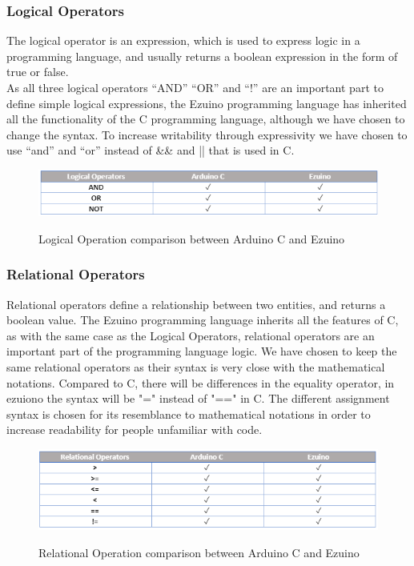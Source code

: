 \subsubsection*{Logical Operators}
The logical operator is an expression, which is used to express logic in a programming language, and usually returns a boolean expression in the form of true or false. \\
As all three logical operators “AND” “OR” and “!” are an important part to define simple logical expressions, the Ezuino programming language has inherited all the functionality of the C programming language, although we have chosen to change the syntax. To increase writability through expressivity we have chosen to use “and” and “or” instead of \&\& and || that is used in C.\\
\begin{figure}[H]
\centering
\caption{Logical Operation comparison between Arduino C and Ezuino}
\includegraphics[scale=0.80]{figures/language_features/langf03.png}
\label{lf03}
\end{figure}
\subsubsection*{Relational Operators}
Relational operators define a relationship between two entities, and returns a boolean value.
The Ezuino programming language inherits all the features of C, as with the same case as the Logical Operators, relational operators are an important part of the programming language logic. We have chosen to keep the same relational operators as their syntax is very close with the mathematical notations. Compared to C, there will be differences in the equality operator, in ezuiono the syntax will be "=" instead of "==" in C. The different assignment syntax is chosen for its resemblance to mathematical notations in order to increase readability for people unfamiliar with code.
\begin{figure}[H]
\centering
\caption{Relational Operation comparison between Arduino C and Ezuino}
\includegraphics[scale=0.80]{figures/language_features/langf04.png}
\label{lf04}
\end{figure}

